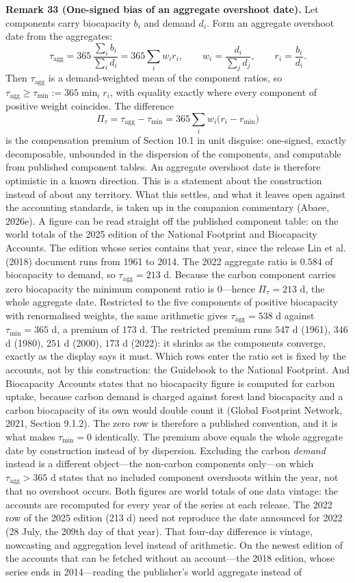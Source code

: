 \documentclass[11pt]{article}
\begin{document}
\textbf{Remark 33 (One-signed bias of an aggregate overshoot date).} Let components carry biocapacity \(b_i\) and demand \(d_i\). Form an aggregate overshoot date from the aggregates: \[ \tau_{\mathrm{agg}}=365\,\frac{\sum_ib_i}{\sum_id_i}=365\sum_iw_ir_i, \qquad w_i=\frac{d_i}{\sum_jd_j}, \qquad r_i=\frac{b_i}{d_i}. \] Then \(\tau_{\mathrm{agg}}\) is a demand-weighted mean of the component ratios, so \(\tau_{\mathrm{agg}}\ge\tau_{\min}:=365\min_ir_i\), with equality exactly where every component of positive weight coincides. The difference \[ \Pi_\tau=\tau_{\mathrm{agg}}-\tau_{\min}=365\sum_iw_i\bigl(r_i-r_{\min}\bigr) \] is the compensation premium of Section 10.1 in unit disguise: one-signed, exactly decomposable, unbounded in the dispersion of the components, and computable from published component tables. An aggregate overshoot date is therefore optimistic in a known direction. This is a statement about the construction instead of about any territory. What this settles, and what it leaves open against the accounting standards, is taken up in the companion commentary (Abaee, 2026e). A figure can be read straight off the published component table: on the world totals of the 2025 edition of the National Footprint and Biocapacity Accounts. The edition whose series contains that year, since the release Lin et al. (2018) document runs from 1961 to 2014. The 2022 aggregate ratio is \(0.584\) of biocapacity to demand, so \(\tau_{\mathrm{agg}} = 213\) d. Because the carbon component carries zero biocapacity the minimum component ratio is \(0\)---hence \(\Pi_\tau = 213\) d, the whole aggregate date. Restricted to the five components of positive biocapacity with renormalised weights, the same arithmetic gives \(\tau_{\mathrm{agg}} = 538\) d against \(\tau_{\min} = 365\) d, a premium of \(173\) d. The restricted premium runs \(547\) d (1961), \(346\) d (1980), \(251\) d (2000), \(173\) d (2022): it shrinks as the components converge, exactly as the display says it must. Which rows enter the ratio set is fixed by the accounts, not by this construction: the Guidebook to the National Footprint. And Biocapacity Accounts states that no biocapacity figure is computed for carbon uptake, because carbon demand is charged against forest land biocapacity and a carbon biocapacity of its own would double count it (Global Footprint Network, 2021, Section 9.1.2). The zero row is therefore a published convention, and it is what makes \(\tau_{\min} = 0\) identically. The premium above equals the whole aggregate date by construction instead of by dispersion. Excluding the carbon \emph{demand} instead is a different object---the non-carbon components only---on which \(\tau_{\mathrm{agg}} > 365\) d states that no included component overshoots within the year, not that no overshoot occurs. Both figures are world totals of one data vintage: the accounts are recomputed for every year of the series at each release. The 2022 row of the 2025 edition (213 d) need not reproduce the date announced for 2022 (28 July, the 209th day of that year). That four-day difference is vintage, nowcasting and aggregation level instead of arithmetic. On the newest edition of the accounts that can be fetched without an account---the 2018 edition, whose series ends in 2014---reading the publisher's world aggregate instead of 
\end{document}
